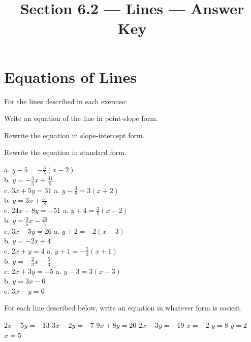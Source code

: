 

\title{Section 6.2 --- Lines --- Answer Key}

\newcommand{\threeqn}[5]{%
a. $y #3 = #1\left(x #2\right)$\\
b. $y=#1 x #4$\\
c. $#5$}


\maketitle

\section*{Equations of Lines}
For the lines described in each exercise:
\begin{clist}
\item Write an equation of the line in point-slope form.
\item Rewrite the equation in slope-intercept form.
\item Rewrite the equation in standard form.
\end{clist}
\begin{smenum}
\mitemxxx
{\threeqn{-\frac{3}{5}}{-2}{-5}{+\frac{31}{5}}{3 x +5 y = 31}}
{\threeqn{3}{+2}{-\frac{3}{8}}{+\frac{51}{8}}{24 x -8 y = -51}}
{\threeqn{\frac{3}{5}}{-2}{+4}{-\frac{26}{5}}{3 x -5 y = 26}}
\mitemxxx
{\threeqn{-2}{-3}{+2}{+4}{2 x + y = 4}}
{\threeqn{-\frac{2}{3}}{+1}{+1}{-\frac{5}{3}}{2 x +3 y = -5}}
{\threeqn{3}{-3}{-3}{-6}{3 x - y = 6}}
\end{smenum}
For each line described below, write an equation in whatever form is easiest.
\begin{smenum}
\mitemxxxx
{$2x+5y=-13$}
{$3x-2y=-7$}
{$9x+8y=20$}
{$2x-3y=-19$}
\mitemxxxx
{$x=-2$}
{$y=8$}
{$y=2$}
{$x=5$}
\end{smenum}

